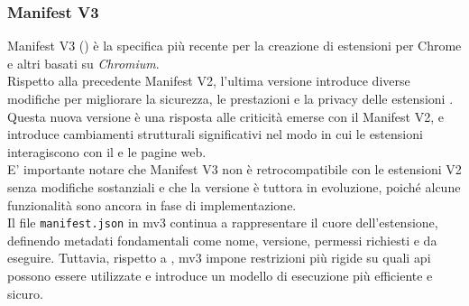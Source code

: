 \subsubsection{Manifest V3}
\label{subsec:mv3}
\noindent Manifest V3 () è la specifica più recente per la creazione di estensioni per Chrome e altri  basati su \textit{Chromium}. \\Rispetto alla precedente Manifest V2, l'ultima versione introduce diverse modifiche per migliorare la sicurezza, le prestazioni e la privacy delle estensioni \cite{site:mv3-chrome}. \\
Questa nuova versione è una risposta alle criticità emerse con il Manifest V2, e introduce cambiamenti strutturali significativi nel modo in cui le estensioni interagiscono con il  e le pagine web.\\
E' importante notare che Manifest V3 non è retrocompatibile con le estensioni V2 senza modifiche sostanziali e che la versione è tuttora in evoluzione, poiché alcune funzionalità sono ancora in fase di implementazione.\\
Il file \texttt{manifest.json} in \acrshort{mv3} continua a rappresentare il cuore dell’estensione, definendo metadati fondamentali come nome, versione, permessi richiesti e  da eseguire. Tuttavia, rispetto a , \acrshort{mv3} impone restrizioni più rigide su quali \acrshort{api} possono essere utilizzate e introduce un modello di esecuzione più efficiente e sicuro.\\\\

